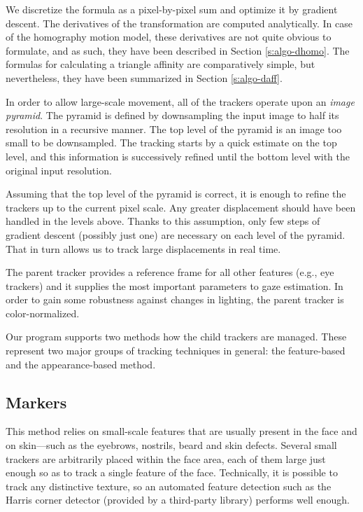 We discretize the formula as a pixel-by-pixel sum and optimize it by gradient descent.
The derivatives of the transformation are computed analytically.
In case of the homography motion model, these derivatives are not quite obvious to formulate, and as such, they have been described in Section \ref{s:algo-dhomo}.
The formulas for calculating a triangle affinity are comparatively simple, but nevertheless, they have been summarized in Section \ref{s:algo-daff}.

In order to allow large-scale movement, all of the trackers operate upon an \textit{image pyramid}.
The pyramid is defined by downsampling the input image to half its resolution in a recursive manner.
The top level of the pyramid is an image too small to be downsampled.
The tracking starts by a quick estimate on the top level, and this information is successively refined until the bottom level with the original input resolution.

Assuming that the top level of the pyramid is correct, it is enough to refine the trackers up to the current pixel scale.
Any greater displacement should have been handled in the levels above.
Thanks to this assumption, only few steps of gradient descent (possibly just one) are necessary on each level of the pyramid.
That in turn allows us to track large displacements in real time.

The parent tracker provides a reference frame for all other features (e.g., eye trackers) and it supplies the most important parameters to gaze estimation.
In order to gain some robustness against changes in lighting, the parent tracker is color-normalized.

Our program supports two methods how the child trackers are managed.
These represent two major groups of tracking techniques in general: the feature-based and the appearance-based method.

\subsection{Markers}
\label{s:impl-markers}

This method relies on small-scale features that are usually present in the face and on skin---such as the eyebrows, nostrils, beard and skin defects.
Several small trackers are arbitrarily placed within the face area, each of them large just enough so as to track a single feature of the face.
Technically, it is possible to track any distinctive texture, so an automated feature detection such as the Harris corner detector (provided by a third-party library) performs well enough.

